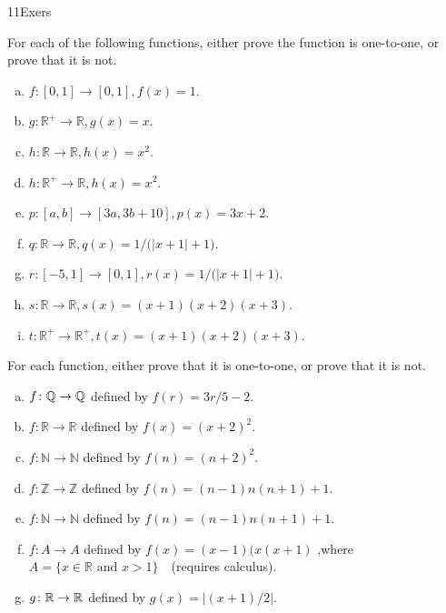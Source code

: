 \begin{exercise}{11Exers}

For each of the following functions, either prove the function is one-to-one, or prove that it is not.
 \begin{enumerate}[(a)]
\item \label{11Exers-formula-f}
\quad $f:[0,1] \rightarrow  [0,1], f(x) = 1$.
\item \label{11Exers-formula-g}
\quad $g:\mathbb{R}^+ \rightarrow  \mathbb{R}, g(x) = x$.
\item \label{11Exers-formula-h}
\quad $h:\mathbb{R} \rightarrow  \mathbb{R},h(x) = x^2$.
\item \label{11Exers-formula-j}
\quad $h:\mathbb{R}^+ \rightarrow  \mathbb{R}, h(x) = x^2$.
\item \label{11Exers-formula-p}
\quad $p:[a,b] \rightarrow  [3a,3b+10], p(x) = 3x + 2$.
\item \label{11Exers-formula-q}
\quad $q:\mathbb{R} \rightarrow  \mathbb{R}, q(x) = 1/ \bigl( |x+1| + 1 \bigr)$.
\item \label{11Exers-formula-r}
\quad $r:[-5,1] \rightarrow  [0,1], r(x) = 1/ \bigl( |x+1| + 1 \bigr)$.
\item \label{11Exers-formula-s}
\quad $s:\mathbb{R} \rightarrow  \mathbb{R}, s(x) = (x+1)(x+2)(x+3)$.
\item \label{11Exers-formula-t}
\quad $t:\mathbb{R}^+ \rightarrow  \mathbb{R}^+, t(x) = (x+1)(x+2)(x+3)$.
\end{enumerate}
\end{exercise}

\begin{exercise}{40} 
For each function, either prove that it is one-to-one, or prove that it is not.
\begin{enumerate}[(a)]
\item \label{IsIt11?-linear}
 $f \colon \mathbb{Q} \to \mathbb{Q}$ defined by $f(r)=3r/5 - 2$.
\item \label{IsIt11?-square0}
 $f \colon {\mathbb R} \to {\mathbb R}$ defined by $f(x)=(x+2)^2$.
\item \label{IsIt11?-square}
 $f \colon {\mathbb N} \to {\mathbb N}$ defined by $f(n)=(n+2)^2$.
\item
 $f \colon {\mathbb Z} \to {\mathbb Z}$ defined by $f(n)=(n-1)n(n+1)+1$.
\item
 $f \colon {\mathbb N} \to {\mathbb N}$ defined by $f(n)=(n-1)n(n+1)+1$.
\item
 $f \colon A \to A$ defined by $f(x)=(x-1)(x(x+1)$ ,where \\
 $A =\{x \in \mathbb{R} \text{ and }x >1 \}$~~(requires calculus).
\item \label{IsIt11?-abs}
 $g \colon \mathbb{R} \to \mathbb{R}$ defined by $g(x)= \left|(x+1)/2 \right|$.
\end{enumerate}
\end{exercise}

